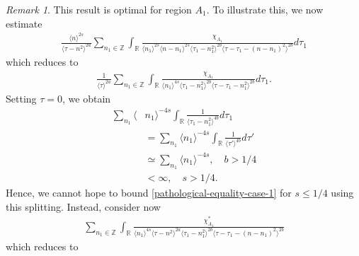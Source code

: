 \documentclass[12pt,reqno]{amsart}
\numberwithin{equation}{section}  %
\numberwithin{figure}{section}
\newcommand{\rr}{\mathbb{R}}
\newcommand{\zz}{\mathbb{Z}}
\theoremstyle{plain}
\theoremstyle{definition}
\theoremstyle{remark}
\newtheorem{remark}{Remark}
\begin{document}
\begin{framed}
\begin{remark}
This result is optimal for region $A_{1}$. To illustrate this, we now estimate
%
%
\begin{equation*}
  \begin{split}
     \frac{ \langle n
    \rangle ^{2s}}{\langle \tau - n^{2} \rangle ^{2a}}
    \sum_{n_{1} \in \zz} \int_{\rr} \frac{\chi_{A_{1}}}{ \langle n_{1} \rangle ^{2s} \langle n-n_{1} \rangle ^{2s} 
    \langle \tau_{1} - n_{1}^{2} \rangle^{2b} \langle  \tau - \tau_{1} -
    (n - n_{1})^{2} \rangle^{2b} }
    d \tau_1 
  \end{split}
\end{equation*}
which reduces to 
\begin{equation}
  \label{pathological-equality-case-1}
  \begin{split}
    \frac{ 1}{\langle \tau \rangle ^{2a}}
    \sum_{n_{1} \in \zz} \int_{\rr} \frac{\chi_{A_{1}}}{ \langle n_{1} \rangle ^{4s}
    \langle \tau_{1} - n_{1}^{2} \rangle^{2b} \langle  \tau - \tau_{1} -
    n_{1}^{2} \rangle^{2b} }
    d \tau_1.
  \end{split}
\end{equation}
%
%
%
%
Setting $\tau = 0$, we obtain
%
%
%
\begin{equation*}
\begin{split}
   \sum_{n_{1}} \langle & n_{1}\rangle ^{-4s} \int_{\rr} \frac{1}{\langle
   \tau_{1} - n_{1}^{2} \rangle ^{4b}}d \tau_{1}
   \\
   & = \sum_{n_{1}} \langle
  n_{1}\rangle ^{-4s} \int_{\rr} \frac{1}{\langle
   \tau' \rangle ^{4b}}d \tau'
   \\
   & \simeq \sum_{n_{1}} \langle n_{1} \rangle ^{-4s}, \quad b > 1/4
   \\
   & < \infty, \quad s > 1/4.
\end{split}
\end{equation*}
%
Hence, we cannot hope to bound \eqref{pathological-equality-case-1} for $s \le
1/4$ using this splitting. Instead, consider now
%
%
\begin{equation*}
\begin{split}
  \sum_{n_{1} \in \zz} \int_{\rr} \frac{\chi^{*}_{A_{1}}}{\langle n_{1} \rangle
  ^{4s} \langle \tau - n^{2} \rangle ^{2a} \langle \tau_{1} - n_{1}^{2} \rangle
  ^{2b} \langle \tau - \tau_{1} - (n - n_{1})^{2} \rangle ^{2b}}
\end{split}
\end{equation*}
%
%
which reduces to 
\begin{equation*}

\end{equation*}
\end{remark}
\end{framed}
\end{document}

